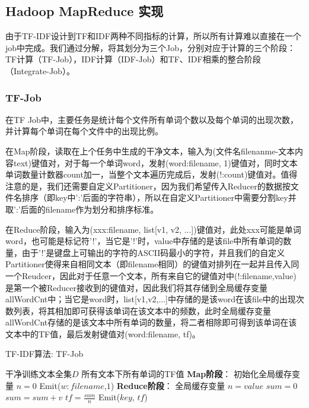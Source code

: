 \documentclass[lang=cn,11pt]{elegantpaper}
\begin{document}
\subsection{Hadoop MapReduce 实现}
由于TF-IDF设计到TF和IDF两种不同指标的计算，所以所有计算难以直接在一个job中完成。我们通过分解，将其划分为三个Job，分别对应于计算的三个阶段：TF计算（TF-Job），IDF计算（IDF-Job）和TF、IDF相乘的整合阶段（Integrate-Job）。\par
\subsubsection{TF-Job}
在TF Job中，主要任务是统计每个文件所有单词个数以及每个单词的出现次数，并计算每个单词在每个文件中的出现比例。\par
在Map阶段，读取在上个任务中生成的干净文本，输入为(文件名filenanme-文本内容text)键值对，对于每一个单词word，发射(word:filename, 1)键值对，同时文本单词数量计数器count加一，当整个文本遍历完成后，发射(!:count)键值对。值得注意的是，我们还需要自定义Partitioner，因为我们希望传入Reducer的数据按文件名排序（即key中':'后面的字符串），所以在自定义Partitioner中需要分割key并取':'后面的filename作为划分和排序标准。\par
在Reduce阶段，输入为(xxx:filename, list[v1, v2, ...])键值对，此处xxx可能是单词word，也可能是标记符'!'，当它是'!'时，value中存储的是该file中所有单词的数量，由于'!'是键盘上可输出的字符的ASCII码最小的字符，并且我们的自定义Partitioner使得来自相同文本（即filename相同）的键值对排列在一起并且传入同一个Reudcer，因此对于任意一个文本，所有来自它的键值对中(!:filename,value)是第一个被Reducer接收到的键值对，因此我们将其存储到全局缓存变量allWordCnt中；当它是word时，list[v1,v2,...]中存储的是该word在该file中的出现次数列表，将其相加即可获得该单词在该文本中的频数，此时全局缓存变量allWordCnt存储的是该文本中所有单词的数量，将二者相除即可得到该单词在该文本中的TF值，最后发射键值对(word:filename, tf)。\par
\begin{algorithm}[htb]  
  \caption{TF-IDF算法: TF-Job}  
  \label{alg:Framwork}
  \begin{algorithmic}[1]
    \Require
    干净训练文本全集$D$
    \Ensure
    所有文本下所有单词的TF值
    \State \textbf{Map阶段}：
    \State 初始化全局缓存变量 $n=0$
    \EndFunction
        \State Emit($w:filename$,$1$)
      \EndFor
    \EndFunction
    \State \textbf{Reduce阶段}：
      \State 全局缓存变量 $n=value$
    \Else
      \State $sum=0$
        \State $sum = sum + v$
      \EndFor
      \State $tf = \frac{sum}{n}$
      \State Emit($key$, $tf$)
    \EndIf
    \EndFunction
  \end{algorithmic}
\end{algorithm}
\end{document}
